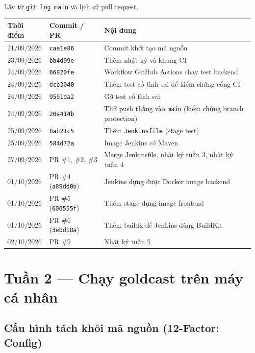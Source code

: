 \documentclass[12pt,a4paper]{article}
\newcommand{\commit}[1]{\texttt{#1}}
\begin{document}
Lấy từ \texttt{git log main} và lịch sử pull request.

\begin{center}
\small
\begin{tabularx}{\linewidth}{llX}
\toprule
Thời điểm & Commit / PR & Nội dung \\
\midrule
21/09/2026 & \commit{cae1e86} & Commit khởi tạo mã nguồn \\
23/09/2026 & \commit{bb4d99e} & Thêm nhật ký và khung CI \\
24/09/2026 & \commit{66820fe} & Workflow GitHub Actions chạy test backend \\
24/09/2026 & \commit{dcb3040} & Thêm test cố tình sai để kiểm chứng cổng CI \\
24/09/2026 & \commit{9561da2} & Gỡ test cố tình sai \\
24/09/2026 & \commit{20e414b} & Thử push thẳng vào \texttt{main} (kiểm chứng branch protection) \\
25/09/2026 & \commit{8ab21c5} & Thêm \texttt{Jenkinsfile} (stage test) \\
25/09/2026 & \commit{584d72a} & Image Jenkins có Maven \\
27/09/2026 & PR \#1, \#2, \#3 & Merge Jenkinsfile, nhật ký tuần 3, nhật ký tuần 4 \\
01/10/2026 & PR \#4 (\commit{a89dd0b}) & Jenkins dựng được Docker image backend \\
01/10/2026 & PR \#5 (\commit{606555f}) & Thêm stage dựng image frontend \\
01/10/2026 & PR \#6 (\commit{3ebd18a}) & Thêm buildx để Jenkins dùng BuildKit \\
02/10/2026 & PR \#9 & Nhật ký tuần 5 \\
\bottomrule
\end{tabularx}
\end{center}

\section{Tuần 2 — Chạy goldcast trên máy cá nhân}

\subsection{Cấu hình tách khỏi mã nguồn (12-Factor: Config)}
\end{document}
